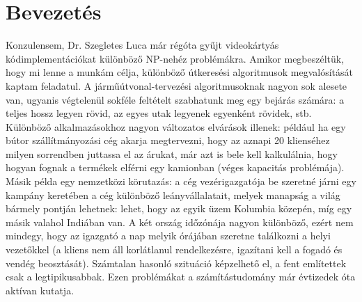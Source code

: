 \chapter{Bevezetés}

Konzulensem, Dr. Szegletes Luca már régóta gyűjt videokártyás kódimplementációkat különböző NP-nehéz problémákra. Amikor megbeszéltük, hogy mi lenne a munkám célja, különböző útkeresési algoritmusok megvalósítását kaptam feladatul. A járműútvonal-tervezési algoritmusoknak nagyon sok alesete van, ugyanis végtelenül sokféle feltételt szabhatunk meg egy bejárás számára: a teljes hossz legyen rövid, az egyes utak legyenek egyenként rövidek, stb. Különböző alkalmazásokhoz nagyon változatos elvárások illenek: például ha egy bútor szállítmányozási cég akarja megtervezni, hogy az aznapi 20 klienséhez milyen sorrendben juttassa el az árukat, már azt is bele kell kalkulálnia, hogy hogyan fognak a termékek elférni egy kamionban (véges kapacitás problémája). Másik példa egy nemzetközi körutazás: a cég vezérigazgatója be szeretné járni egy kampány keretében a cég különböző leányvállalatait, melyek manapság a világ bármely pontján lehetnek: lehet, hogy az egyik üzem Kolumbia közepén, míg egy másik valahol Indiában van. A két ország időzónája nagyon különböző, ezért nem mindegy, hogy az igazgató a nap melyik órájában szeretne találkozni a helyi vezetőkkel (a kliens nem áll korlátlanul rendelkezésre, igazítani kell a fogadó és vendég beosztását). Számtalan hasonló szituáció képzelhető el, a fent említettek csak a legtipikusabbak. Ezen problémákat a számítástudomány már évtizedek óta aktívan kutatja. 

